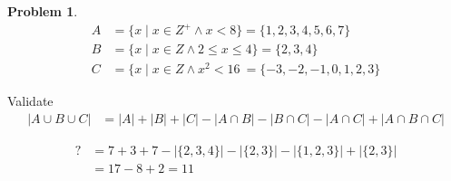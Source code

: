 \documentclass{article}
\theoremstyle{definition}
\newtheorem{problem}{Problem}[section]
\begin{document}
\begin{problem}
\[

    \begin{aligned}
        A &= \{x \mid x \in Z^+ \land x < 8\} = \{1, 2, 3, 4, 5, 6, 7\}\\
        B &= \{x \mid x \in Z \land 2 \leq x \leq 4\} = \{2, 3, 4\}\\
        C &= \{x \mid x \in Z \land x^2 < 16\ = \{-3, -2, -1, 0, 1, 2, 3\}
    \end{aligned}
\]

Validate
\[
    \begin{aligned}
        |A \cup B \cup C| &= |A| + |B| + |C| - |A \cap B| - |B \cap C| - |A \cap C| + |A \cap B \cap C|
    \end{aligned}
\]

\[
    \begin{aligned}
        ? &= 7 + 3 + 7 - |\{2, 3, 4\}| - |\{2, 3\}| - |\{1, 2, 3\}| + |\{2, 3\}|\\
          &= 17 - 8 + 2 = 11
    \end{aligned}
\]
\end{problem}
\end{document}
